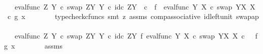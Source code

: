 \begin{isabellebody}
\ \ \ \ \isamarkupfalse%
\ \isamarkupfalse%
\ {\isachardoublequoteopen}{\isachardot}{\kern0pt}{\isachardot}{\kern0pt}{\isachardot}{\kern0pt}\ {\isacharequal}{\kern0pt}\ {\isacharparenleft}{\kern0pt}eval{\isacharunderscore}{\kern0pt}func\ Z\ Y\ {\isasymcirc}\isactrlsub c\ swap\ {\isacharparenleft}{\kern0pt}Z\isactrlbsup Y\isactrlesup {\isacharparenright}{\kern0pt}\ Y{\isacharparenright}{\kern0pt}\ {\isasymcirc}\isactrlsub c\ {\isasymlangle}id\isactrlsub c\ {\isacharparenleft}{\kern0pt}Z\isactrlbsup Y\isactrlesup {\isacharparenright}{\kern0pt}\ \ {\isasymcirc}\isactrlsub c\ \ f\ {\isacharcomma}{\kern0pt}\ {\isacharparenleft}{\kern0pt}eval{\isacharunderscore}{\kern0pt}func\ Y\ X\ {\isasymcirc}\isactrlsub c\ swap\ {\isacharparenleft}{\kern0pt}Y\isactrlbsup X\isactrlesup {\isacharparenright}{\kern0pt}\ X{\isacharparenright}{\kern0pt}\ \ {\isasymcirc}\isactrlsub c\ {\isasymlangle}g{\isacharcomma}{\kern0pt}\ x{\isasymrangle}{\isasymrangle}{\isachardoublequoteclose}\isanewline
\ \ \ \ \ \ \isamarkupfalse%
\ {\isacharparenleft}{\kern0pt}typecheck{\isacharunderscore}{\kern0pt}cfuncs{\isacharcomma}{\kern0pt}\ smt\ {\isacharparenleft}{\kern0pt}z{}{\isacharparenright}{\kern0pt}\ assms\ comp{\isacharunderscore}{\kern0pt}associative{}\ id{\isacharunderscore}{\kern0pt}left{\isacharunderscore}{\kern0pt}unit{}\ swap{\isacharunderscore}{\kern0pt}ap{\isacharparenright}{\kern0pt}\isanewline
\ \ \ \ \isamarkupfalse%
\ \isamarkupfalse%
\ {\isachardoublequoteopen}{\isachardot}{\kern0pt}{\isachardot}{\kern0pt}{\isachardot}{\kern0pt}\ {\isacharequal}{\kern0pt}\ {\isacharparenleft}{\kern0pt}eval{\isacharunderscore}{\kern0pt}func\ Z\ Y\ {\isasymcirc}\isactrlsub c\ swap\ {\isacharparenleft}{\kern0pt}Z\isactrlbsup Y\isactrlesup {\isacharparenright}{\kern0pt}\ Y{\isacharparenright}{\kern0pt}\ {\isasymcirc}\isactrlsub c\ {\isacharparenleft}{\kern0pt}id\isactrlsub c\ {\isacharparenleft}{\kern0pt}Z\isactrlbsup Y\isactrlesup {\isacharparenright}{\kern0pt}\ {\isasymtimes}\isactrlsub f\ {\isacharparenleft}{\kern0pt}eval{\isacharunderscore}{\kern0pt}func\ Y\ X\ {\isasymcirc}\isactrlsub c\ swap\ {\isacharparenleft}{\kern0pt}Y\isactrlbsup X\isactrlesup {\isacharparenright}{\kern0pt}\ X{\isacharparenright}{\kern0pt}{\isacharparenright}{\kern0pt}\ {\isasymcirc}\isactrlsub c\ \ \ {\isasymlangle}f{\isacharcomma}{\kern0pt}{\isasymlangle}g{\isacharcomma}{\kern0pt}\ x{\isasymrangle}{\isasymrangle}{\isachardoublequoteclose}\isanewline
\ \ \ \ \ \ \isamarkupfalse%
\ assms\ \isamarkupfalse%

\end{isabellebody}
